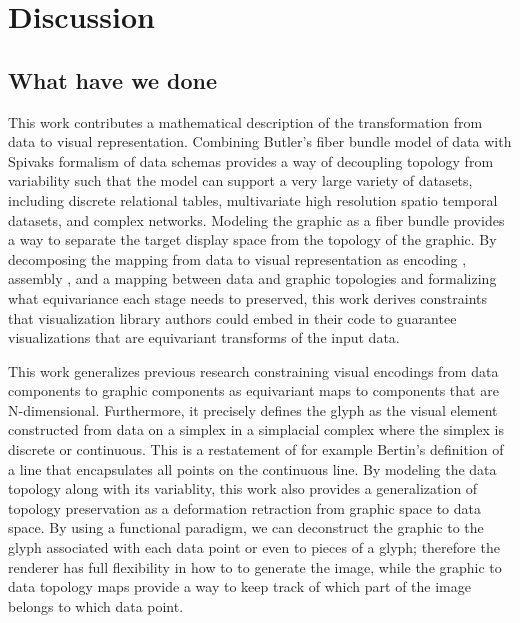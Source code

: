 \documentclass[../main.tex]{subfiles}
\begin{document}
\section{Discussion}


\subsection{What have we done}
This work contributes a mathematical description of the transformation from data to visual representation. Combining Butler's fiber bundle model of data with Spivaks formalism of data schemas provides a way of decoupling topology from variability such that the model can support a very large variety of datasets, including discrete relational tables, multivariate high resolution spatio temporal datasets, and complex networks. Modeling the graphic as a fiber bundle provides a way to separate the target display space from the topology of the graphic. By decomposing the mapping from data to visual representation as encoding \vchannel, assembly \vmark, and a mapping between data and graphic topologies \vindex and formalizing what equivariance each stage needs to preserved, this work derives constraints that visualization library authors could embed in their code to guarantee visualizations that are equivariant transforms of the input data. 

This work generalizes previous research constraining visual encodings from data components to graphic components as equivariant maps to components that are N-dimensional. Furthermore, it precisely defines the glyph as the visual element constructed from data on a simplex in a simplacial complex where the simplex is discrete or continuous. This is a restatement of for example Bertin's definition of a line that encapsulates all points on the continuous line.  By modeling the data topology along with its variablity, this work also provides  a generalization of topology preservation as a deformation retraction from graphic space to data space. By using a functional paradigm, we can deconstruct the graphic to the glyph associated with each data point or even to pieces of a glyph; therefore the renderer has full  flexibility in how to to generate the image, while the graphic to data topology maps provide a way to keep track of which part of the image belongs to which data point. 
\end{document}
